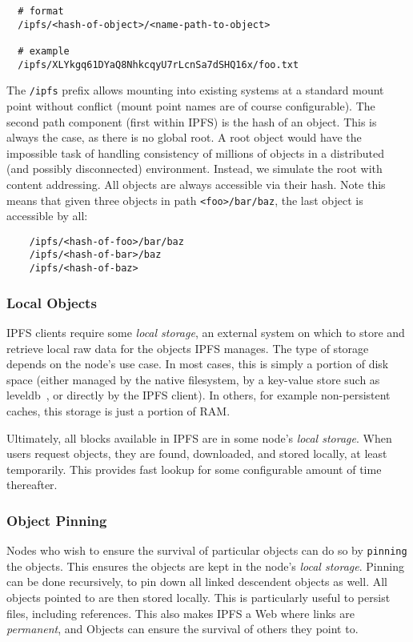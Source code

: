 \documentclass{sig-alternate}
\begin{document}
\begin{verbatim}
  # format
  /ipfs/<hash-of-object>/<name-path-to-object>

  # example
  /ipfs/XLYkgq61DYaQ8NhkcqyU7rLcnSa7dSHQ16x/foo.txt
\end{verbatim}

The \texttt{/ipfs} prefix allows mounting into existing systems at a standard mount point without conflict (mount point names are of course configurable). The second path component (first within IPFS) is the hash of an object. This is always the case, as there is no global root. A root object would have the impossible task of handling consistency of millions of objects in a distributed (and possibly disconnected) environment. Instead, we simulate the root with content addressing. All objects are always accessible via their hash. Note this means that given three objects in path \texttt{<foo>/bar/baz}, the last object is accessible by all:

\begin{verbatim}
    /ipfs/<hash-of-foo>/bar/baz
    /ipfs/<hash-of-bar>/baz
    /ipfs/<hash-of-baz>
\end{verbatim}

\subsubsection{Local Objects}

IPFS clients require some \textit{local storage}, an external system
on which to store and retrieve local raw data for the objects IPFS manages.
The type of storage depends on the node's use case.
In most cases, this is simply a portion of disk space (either managed by
the native filesystem, by a key-value store such as leveldb~\cite{dean11}, or
directly by the IPFS client). In others, for example non-persistent caches,
this storage is just a portion of RAM.

Ultimately, all blocks available in IPFS are in some node's
\textit{local storage}. When users request objects, they are
found, downloaded, and stored locally, at least temporarily. This provides
fast lookup for some configurable amount of time thereafter.

\subsubsection{Object Pinning}

Nodes who wish to ensure the survival of particular objects can do so by
\texttt{pinning} the objects. This ensures the objects are kept in the node's
\textit{local storage}. Pinning can be done recursively, to pin down all
linked descendent objects as well. All objects pointed to are then stored
locally. This is particularly useful to persist files, including references.
This also makes IPFS a Web where links are \textit{permanent}, and Objects can
ensure the survival of others they point to.
\end{document}
